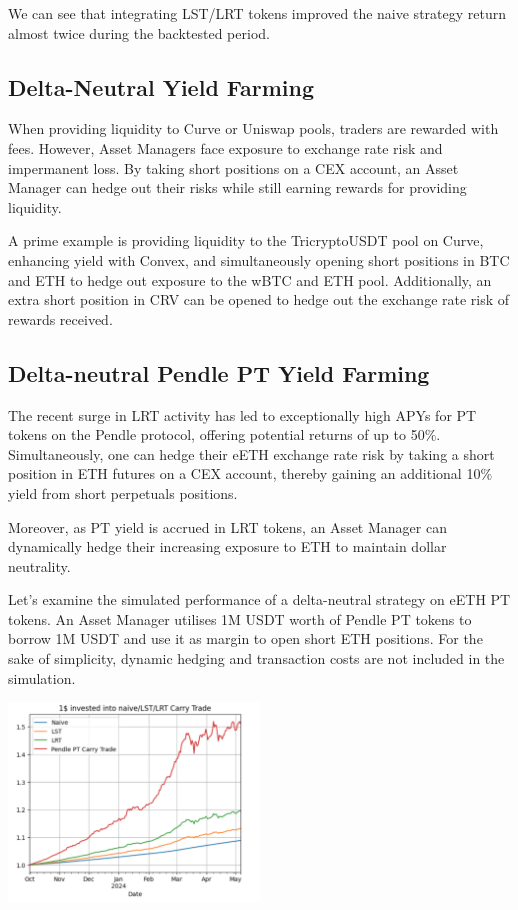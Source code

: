 \documentclass[conference]{IEEEtran}
\begin{document}
We can see that integrating LST/LRT tokens improved the naive strategy return almost twice during the backtested period. 

\subsection{Delta-Neutral Yield Farming}

When providing liquidity to Curve or Uniswap pools, traders are rewarded with fees. However, Asset Managers face exposure to exchange rate risk and impermanent loss. By taking short positions on a CEX account, an Asset Manager can hedge out their risks while still earning rewards for providing liquidity.

A prime example is providing liquidity to the TricryptoUSDT pool on Curve, enhancing yield with Convex, and simultaneously opening short positions in BTC and ETH to hedge out exposure to the wBTC and ETH pool. Additionally, an extra short position in CRV can be opened to hedge out the exchange rate risk of rewards received.

\subsection{Delta-neutral Pendle PT Yield Farming}

The recent surge in LRT activity has led to exceptionally high APYs for PT tokens on the Pendle protocol, offering potential returns of up to 50$\%$. Simultaneously, one can hedge their eETH exchange rate risk by taking a short position in ETH futures on a CEX account, thereby gaining an additional 10$\%$ yield from short perpetuals positions.

Moreover, as PT yield is accrued in LRT tokens, an Asset Manager can dynamically hedge their increasing exposure to ETH to maintain dollar neutrality.

Let’s examine the simulated performance of a delta-neutral strategy on eETH PT tokens. An Asset Manager utilises 1M USDT worth of Pendle PT tokens to borrow 1M USDT and use it as margin to open short ETH positions. For the sake of simplicity, dynamic hedging and transaction costs are not included in the simulation. 


{
\centering
\includegraphics[width=0.5\textwidth]{images/pendle_theoretical.png}
}
\end{document}

